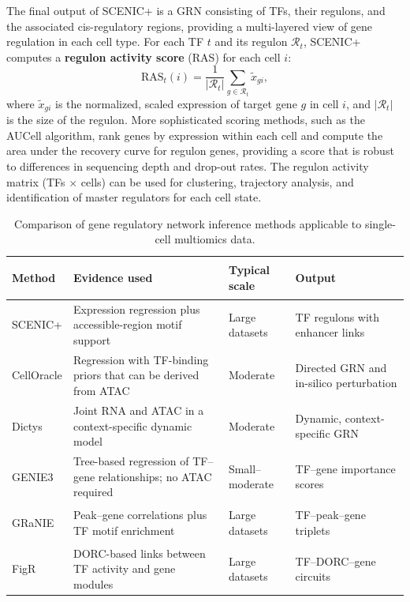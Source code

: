 The final output of SCENIC+ is a GRN consisting of TFs, their regulons, and the associated cis-regulatory regions, providing a multi-layered view of gene regulation in each cell type. For each TF $t$ and its regulon $\mathcal{R}_t$, SCENIC+ computes a \textbf{regulon activity score} (RAS) for each cell $i$:
\begin{equation}
  \text{RAS}_t(i) = \frac{1}{|\mathcal{R}_t|} \sum_{g \in \mathcal{R}_t} \tilde{x}_{gi},
  \label{eq:multiomics:ras}
\end{equation}
where $\tilde{x}_{gi}$ is the normalized, scaled expression of target gene $g$ in cell $i$, and $|\mathcal{R}_t|$ is the size of the regulon. More sophisticated scoring methods, such as the AUCell algorithm, rank genes by expression within each cell and compute the area under the recovery curve for regulon genes, providing a score that is robust to differences in sequencing depth and drop-out rates. The regulon activity matrix (TFs $\times$ cells) can be used for clustering, trajectory analysis, and identification of master regulators for each cell state.

\begin{table}[htbp]
\centering
\caption[Comparison of GRN inference methods for single-cell multiomics.]{Comparison of gene regulatory network inference methods applicable to single-cell multiomics data.}
\label{tab:multiomics:grn-comparison}
\footnotesize
\begin{tabularx}{\textwidth}{>{\bfseries\raggedright\arraybackslash}p{1.8cm} X >{\raggedright\arraybackslash}p{2.1cm} >{\raggedright\arraybackslash}p{3.7cm}}
\toprule
\textbf{Method} & \textbf{Evidence used} & \textbf{Typical scale} & \textbf{Output} \\
\midrule
SCENIC+ & Expression regression plus accessible-region motif support & Large datasets & TF regulons with enhancer links \\
\addlinespace
CellOracle & Regression with TF-binding priors that can be derived from ATAC & Moderate & Directed GRN and in-silico perturbation \\
\addlinespace
Dictys & Joint RNA and ATAC in a context-specific dynamic model & Moderate & Dynamic, context-specific GRN \\
\addlinespace
GENIE3 & Tree-based regression of TF--gene relationships; no ATAC required & Small--moderate & TF--gene importance scores \\
\addlinespace
GRaNIE & Peak--gene correlations plus TF motif enrichment & Large datasets & TF--peak--gene triplets \\
\addlinespace
FigR & DORC-based links between TF activity and gene modules & Large datasets & TF--DORC--gene circuits \\
\bottomrule
\end{tabularx}
\end{table}

